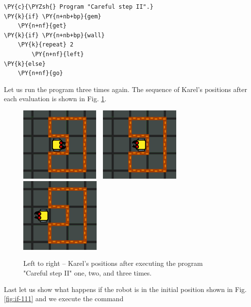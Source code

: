 \begin{bbox}
\begin{Verbatim}[commandchars=\\\{\}]
\PY{c}{\PYZsh{} Program "Careful step II".}
\PY{k}{if} \PY{n+nb+bp}{gem}
    \PY{n+nf}{get}
\PY{k}{if} \PY{n+nb+bp}{wall}
    \PY{k}{repeat} 2
        \PY{n+nf}{left}
\PY{k}{else}
    \PY{n+nf}{go}
\end{Verbatim}
\end{bbox}
\vspace{6mm}

\noindent
Let us run the program three times again. The sequence of Karel's positions 
after each evaluation is shown in Fig. \ref{fig:if-115}.\\[-7mm]

\begin{figure}[!ht]
\begin{center}
\includegraphics[width=3.97cm]{img/if-112.png}\ \ 
\includegraphics[width=4cm]{img/if-113.png}\ \ 
\includegraphics[width=4cm]{img/if-115.png}
\vspace{-0mm}
\caption{Left to right -- Karel's positions after executing the program "Careful step II" 
         one, two, and three times.}
\label{fig:if-115}
\vspace{-1cm}
\end{center}
\end{figure}
\newpage
\noindent
Last let us show what happens if the robot is in the initial 
position shown in Fig. \ref{fig:if-111} and we execute the 
command\\


